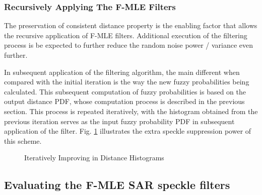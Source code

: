 \subsubsection{Recursively Applying The F-MLE Filters}

The preservation of consistent distance property is the enabling factor that allows the recursive application of F-MLE filters.
Additional execution of the filtering process is be expected to further reduce the random noise power / variance even further.

In subsequent application of the filtering algorithm, the main different when compared with the initial iteration is the way the new fuzzy probabilities being calculated.
This subsequent computation of fuzzy probabilities is based on the output distance PDF, whose computation process is described in the previous section.
This process is repeated iteratively, with the histogram obtained from the previous iteration serves as the input fuzzy probability PDF in subsequent application of the filter.
Fig. \ref{fig:plot_incl_distance_pdf_by_iterations} illustrates the extra speckle suppression power of this scheme.

\begin{figure}[H]
\centering
\caption{Iteratively Improving in Distance Histograms}
\label{fig:plot_incl_distance_pdf_by_iterations}
\end{figure}


\subsection{Evaluating the F-MLE SAR speckle filters}

